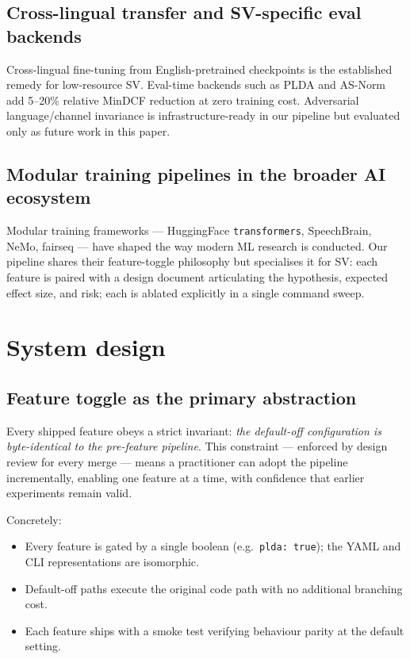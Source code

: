 \documentclass[11pt,a4paper]{article}
\begin{document}
\subsection{Cross-lingual transfer and SV-specific eval backends}

Cross-lingual fine-tuning from English-pretrained checkpoints is the
established remedy for low-resource SV. Eval-time backends such as
PLDA \cite{sizov2014unifying} and AS-Norm \cite{matejka2017analysis}
add 5--20\% relative MinDCF reduction at zero training cost.
Adversarial language/channel invariance \cite{ganin2015dann} is
infrastructure-ready in our pipeline but evaluated only as future
work in this paper.

\subsection{Modular training pipelines in the broader AI ecosystem}

Modular training frameworks --- HuggingFace \texttt{transformers},
SpeechBrain, NeMo, fairseq --- have shaped the way modern ML research
is conducted. Our pipeline shares their feature-toggle philosophy but
specialises it for SV: each feature is paired with a design document
articulating the hypothesis, expected effect size, and risk; each is
ablated explicitly in a single command sweep.

\section{System design}
\label{sec:design}

\subsection{Feature toggle as the primary abstraction}

Every shipped feature obeys a strict invariant: \emph{the default-off
configuration is byte-identical to the pre-feature pipeline}. This
constraint --- enforced by design review for every merge --- means a
practitioner can adopt the pipeline incrementally, enabling one feature
at a time, with confidence that earlier experiments remain valid.

Concretely:
\begin{itemize}[leftmargin=*]
    \item Every feature is gated by a single boolean (e.g.\ \texttt{plda:
    true}); the YAML and CLI representations are isomorphic.
    \item Default-off paths execute the original code path with no
    additional branching cost.
    \item Each feature ships with a smoke test verifying behaviour
    parity at the default setting.
\end{itemize}
\end{document}
